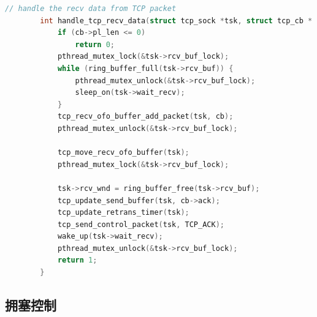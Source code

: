 \documentclass[UTF8]{report}
\begin{document}
\begin{enumerate}
\begin{lstlisting}[language=C]
        // handle the recv data from TCP packet
        int handle_tcp_recv_data(struct tcp_sock *tsk, struct tcp_cb * cb) {
            if (cb->pl_len <= 0)
                return 0;
            pthread_mutex_lock(&tsk->rcv_buf_lock);
            while (ring_buffer_full(tsk->rcv_buf)) {
                pthread_mutex_unlock(&tsk->rcv_buf_lock);
                sleep_on(tsk->wait_recv);
            }
            tcp_recv_ofo_buffer_add_packet(tsk, cb);
            pthread_mutex_unlock(&tsk->rcv_buf_lock);
        
            tcp_move_recv_ofo_buffer(tsk);
            pthread_mutex_lock(&tsk->rcv_buf_lock);
        
            tsk->rcv_wnd = ring_buffer_free(tsk->rcv_buf);
            tcp_update_send_buffer(tsk, cb->ack);
            tcp_update_retrans_timer(tsk);
            tcp_send_control_packet(tsk, TCP_ACK);
            wake_up(tsk->wait_recv);
            pthread_mutex_unlock(&tsk->rcv_buf_lock);
            return 1;
        }
    \end{lstlisting}
\end{enumerate}

\subsection{拥塞控制}
\end{document}
